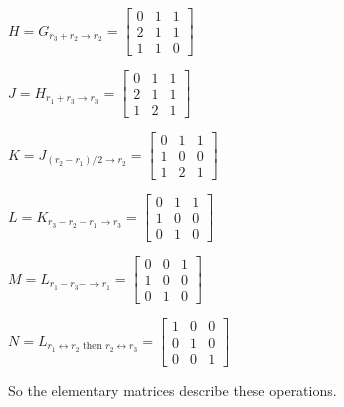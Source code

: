 \documentclass{article}
\begin{document}
$H=G_{r_3+r_2\rightarrow r_2} = \left[\begin{array}{ccc}
0 & 1 &  1\\
2 & 1 & 1\\
1& 1 & 0
\end{array}\right] $

$J=H_{r_1+r_3\rightarrow r_3} = \left[\begin{array}{ccc}
0 & 1 &  1\\
2 & 1 & 1\\
1& 2 & 1
\end{array}\right] $


$K=J_{(r_2-r_1)/2\rightarrow r_2} = \left[\begin{array}{ccc}
0 & 1 & 1 \\
1 & 0 & 0\\
1& 2 & 1
\end{array}\right]$

$L=K_{r_3-r_2-r_1\rightarrow r_3} = \left[\begin{array}{ccc}
0 & 1 & 1 \\
1 & 0 & 0\\
0& 1 & 0
\end{array}\right]$

$M=L_{r_1-r_3-\rightarrow r_1} = \left[\begin{array}{ccc}
0 & 0 & 1 \\
1 & 0 & 0\\
0& 1 & 0
\end{array}\right]$

$N=L_{r_1\leftrightarrow r_2 \text{ then } r_2 \leftrightarrow r_3} = \left[\begin{array}{ccc}
1 & 0 & 0 \\
0 & 1 & 0\\
0& 0 & 1
\end{array}\right]$

So the elementary matrices describe these operations. 
\end{document}
